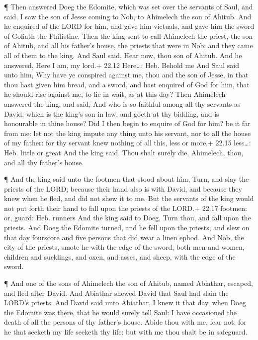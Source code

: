  ¶ Then answered Doeg the Edomite, which was set over the
servants of Saul, and said, I saw the son of Jesse coming to Nob, to
Ahimelech the son of Ahitub.  And he enquired of the LORD
for him, and gave him victuals, and gave him the sword of Goliath the
Philistine.  Then the king sent to call Ahimelech the
priest, the son of Ahitub, and all his father's house, the priests that
were in Nob: and they came all of them to the king.  And
Saul said, Hear now, thou son of Ahitub. And he answered, Here I am, my
lord.+ 22.12 Here\ldots: Heb. Behold me  And Saul said unto
him, Why have ye conspired against me, thou and the son of Jesse, in
that thou hast given him bread, and a sword, and hast enquired of God
for him, that he should rise against me, to lie in wait, as at this day?
 Then Ahimelech answered the king, and said, And who is so
faithful among all thy servants as David, which is the king's son in
law, and goeth at thy bidding, and is honourable in thine house?
 Did I then begin to enquire of God for him? be it far from
me: let not the king impute any thing unto his servant, nor to all the
house of my father: for thy servant knew nothing of all this, less or
more.+ 22.15 less\ldots: Heb. little or great  And the king
said, Thou shalt surely die, Ahimelech, thou, and all thy father's
house.

 ¶ And the king said unto the footmen that stood about him,
Turn, and slay the priests of the LORD; because their hand also is with
David, and because they knew when he fled, and did not shew it to me.
But the servants of the king would not put forth their hand to fall upon
the priests of the LORD.+ 22.17 footmen: or, guard: Heb. runners
 And the king said to Doeg, Turn thou, and fall upon the
priests. And Doeg the Edomite turned, and he fell upon the priests, and
slew on that day fourscore and five persons that did wear a linen ephod.
 And Nob, the city of the priests, smote he with the edge
of the sword, both men and women, children and sucklings, and oxen, and
asses, and sheep, with the edge of the sword.

 ¶ And one of the sons of Ahimelech the son of Ahitub,
named Abiathar, escaped, and fled after David.  And
Abiathar shewed David that Saul had slain the LORD's priests.
 And David said unto Abiathar, I knew it that day, when
Doeg the Edomite was there, that he would surely tell Saul: I have
occasioned the death of all the persons of thy father's house.
 Abide thou with me, fear not: for he that seeketh my life
seeketh thy life: but with me thou shalt be in safeguard.

